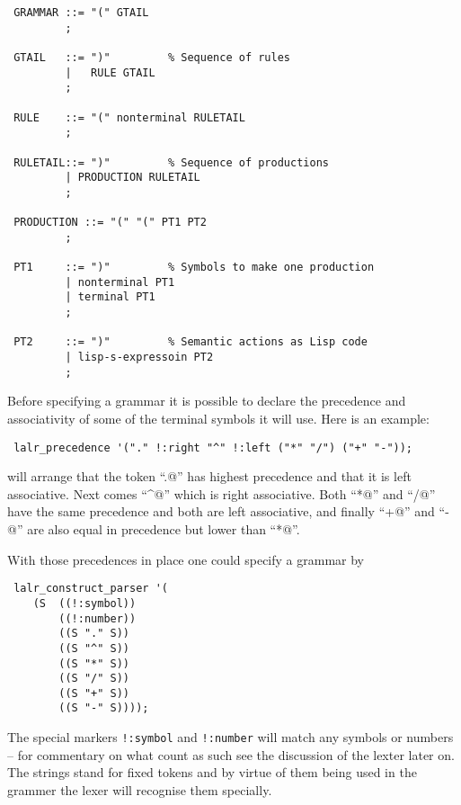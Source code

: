 \begin{verbatim}
 GRAMMAR ::= "(" GTAIL
         ;

 GTAIL   ::= ")"         % Sequence of rules
         |   RULE GTAIL
         ;

 RULE    ::= "(" nonterminal RULETAIL
         ;

 RULETAIL::= ")"         % Sequence of productions
         | PRODUCTION RULETAIL
         ;

 PRODUCTION ::= "(" "(" PT1 PT2
         ;

 PT1     ::= ")"         % Symbols to make one production
         | nonterminal PT1
         | terminal PT1
         ;

 PT2     ::= ")"         % Semantic actions as Lisp code
         | lisp-s-expressoin PT2
         ; 
\end{verbatim}

Before specifying a grammar it is possible to declare the precedence and
associativity of some of the terminal symbols it will use. Here is an
example:
\begin{verbatim}
 lalr_precedence '("." !:right "^" !:left ("*" "/") ("+" "-"));
\end{verbatim}
\noindent will arrange that the token ``\verb@.@'' has highest precedence
and that it is left associative. Next comes ``\verb@^@'' which is right
associative.
Both ``\verb@*@'' and ``\verb@/@'' have the same precedence and both are
left associative, and finally ``\verb@+@'' and ``\verb@-@'' are also equal
in precedence but lower than ``\verb@*@''.

With those precedences in place one could specify a grammar by
\begin{verbatim}
 lalr_construct_parser '(
    (S  ((!:symbol))
        ((!:number))
        ((S "." S))
        ((S "^" S))
        ((S "*" S))
        ((S "/" S))
        ((S "+" S))
        ((S "-" S))));
\end{verbatim}

The special markers \verb+!:symbol+ and \verb+!:number+ will match any
symbols or numbers -- for commentary on what count as such see the discussion
of the lexter later on. The strings stand for fixed tokens and by virtue
of them being used in the grammer the lexer will recognise them specially.

